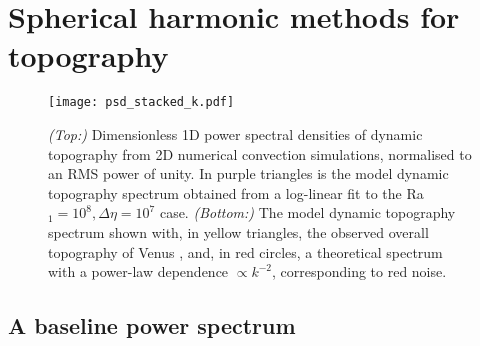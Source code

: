\chapter{Spherical harmonic methods for topography} 
\label{sec:sph-harms}

\ifpdf
    \graphicspath{{Chapter1/Figs/Raster/}{Chapter1/Figs/PDF/}{Chapter1/Figs/}}
\else
    \graphicspath{{Chapter1/Figs/Vector/}{Chapter1/Figs/}}
\fi


\begin{figure}
    \centering
    \texttt{[image: psd\_stacked\_k.pdf]}
    \caption[Dimensionless 1D power spectral densities of dynamic topography.]{\textit{(Top:)} Dimensionless 1D power spectral densities of dynamic topography from 2D numerical convection simulations, normalised to an RMS power of unity. In purple triangles is the model dynamic topography spectrum obtained from a log-linear fit to the Ra$_1 = 10^8, \Delta \eta = 10^7$ case. \textit{(Bottom:)} The model dynamic topography spectrum shown with, in yellow triangles, the observed overall topography of Venus \citep{wieczorek_gravity_2015}, and, in red circles, a theoretical spectrum with a power-law dependence $\propto k^{-2}$, corresponding to red noise.
    \label{fig:top-spectra}}
\end{figure}



\section*{A baseline power spectrum} \label{sec:spectral-model}

